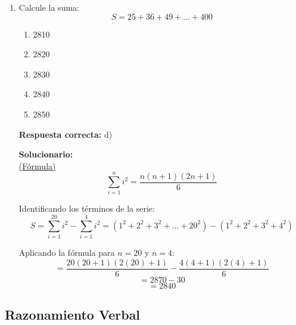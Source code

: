\begin{enumerate}
	\textbf{Respuesta correcta:} a)
	
	\vspace{2mm}
	\textbf{Solucionario:}\\
	Dando la forma de la definición:\\
	$$128 \circledast 243 = 2 \cdot 4^3 \circledast 3 \cdot 3^4$$\\
	De donde se obtiene que:\\
	$a = 4$ y $b = 3$\\
	
	Remplazando:\\
	$\Rightarrow \sqrt{4^2 + 3^2}$\\
	$= \sqrt{16 + 9} = \sqrt{25} = 5$\\
	
	\vspace{6mm}


	\item Calcule la suma:
	$$S = 25 + 36 + 49 + \dots + 400$$
	
	\begin{enumerate}[label=\alph*)]
		\item 2810
		\item 2820
		\item 2830
		\item 2840
		\item 2850
	\end{enumerate}
	
	\textbf{Respuesta correcta:} d)
	
	\vspace{2mm}
	\textbf{Solucionario:}\\
	\underline{(Fórmula)}
	$$\sum_{i=1}^{n} i^2 = \frac{n(n+1)(2n+1)}{6}$$
	
	Identificando los términos de la serie:
	$$S = \sum_{i=1}^{20} i^2 - \sum_{i=1}^{4} i^2 = (1^2 + 2^2 + 3^2 + \dots + 20^2) - (1^2 + 2^2 + 3^2 + 4^2)$$
	
	Aplicando la fórmula para $n=20$ y $n=4$:
	$$= \frac{20(20+1)(2(20)+1)}{6} - \frac{4(4+1)(2(4)+1)}{6}$$
	$$= 2870 - 30$$
	$$= 2840$$
	
	\vspace{6mm}
	
	
\end{enumerate}





\subsection*{Razonamiento Verbal}

